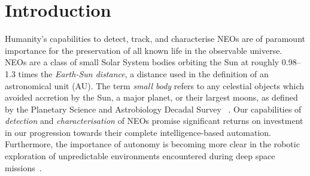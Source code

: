 \chapter{Introduction}\label{chap:introduction}

Humanity's capabilities to detect, track, and characterise \glspl{NEO} are of paramount importance for the preservation of all known life in the observable universe. \glspl{NEO} are a class of small Solar System bodies orbiting the Sun at roughly 0.98--1.3 times the \textit{Earth-Sun distance}, a distance used in the definition of an astronomical unit (AU). The term \textit{small body} refers to any celestial objects which avoided accretion by the Sun, a major planet, or their largest moons, as defined by the Planetary Science and Astrobiology Decadal Survey ~\cite{Davidsson2021}. Our capabilities of \textit{detection} and \textit{characterisation} of \glspl{NEO} promise significant returns on investment in our progression towards their complete intelligence-based automation. Furthermore, the importance of autonomy is becoming more clear in the robotic exploration of unpredictable environments encountered during deep space missions~\cite{Nesnas2021}. %

